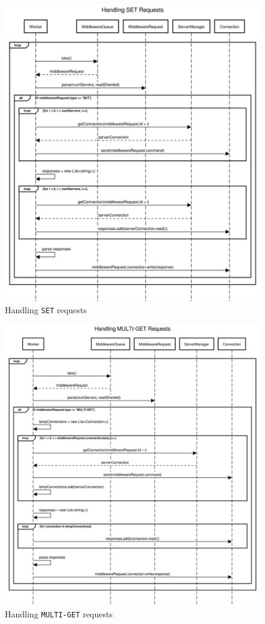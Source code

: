 \documentclass[11pt,a4paper]{article}
\begin{document}
%
\begin{figure}[H]
    \includegraphics[width=\linewidth]{../illustrations/handling_set.png}
    \caption{Handling \texttt{SET} requests}
    \label{fig:handling_set}
\end{figure}
%
\begin{figure}[H]
    \includegraphics[width=\linewidth]{../illustrations/handling_mget.png}
    \caption{Handling \texttt{MULTI-GET} requests}
    \label{fig:handling_mget}
\end{figure}
\end{document}
